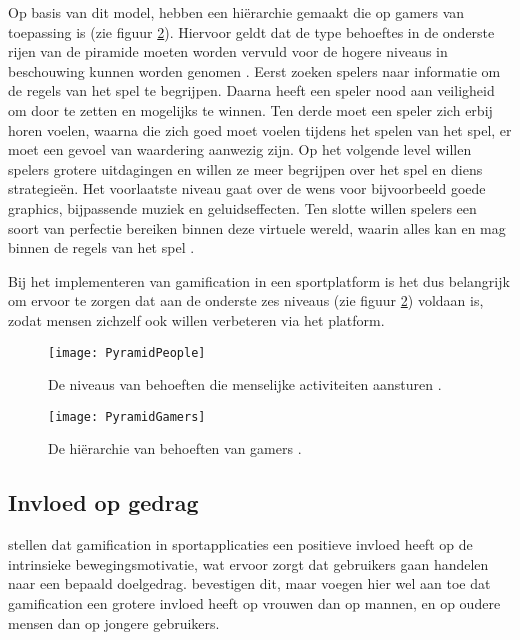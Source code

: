 Op basis van dit model, hebben \textcite{Siang2003} een hiërarchie gemaakt die op gamers van toepassing is (zie figuur \ref{fig:gamers-hierarchy}).
Hiervoor geldt dat de type behoeftes in de onderste rijen van de piramide moeten worden vervuld voor de hogere niveaus in beschouwing kunnen worden genomen \autocite{Richter2014}.
Eerst zoeken spelers naar informatie om de regels van het spel te begrijpen. Daarna heeft een speler nood aan veiligheid om door te zetten en mogelijks te winnen. Ten derde moet een speler zich erbij horen voelen, waarna die zich goed moet voelen tijdens het spelen van het spel, er moet een gevoel van waardering aanwezig zijn. Op het volgende level willen spelers grotere uitdagingen en willen ze meer begrijpen over het spel en diens strategieën. Het voorlaatste niveau gaat over de wens voor bijvoorbeeld goede graphics, bijpassende muziek en geluidseffecten. Ten slotte willen spelers een soort van perfectie bereiken binnen deze virtuele wereld, waarin alles kan en mag binnen de regels van het spel \autocite{Greitzer2007, Siang2003}.

Bij het implementeren van gamification in een sportplatform is het dus belangrijk om ervoor te zorgen dat aan de onderste zes niveaus (zie figuur \ref{fig:gamers-hierarchy}) voldaan is, zodat mensen zichzelf ook willen verbeteren via het platform.

\begin{figure}[h]
    \caption[Behoeften-hiërarchie algemeen]{De  niveaus van behoeften die menselijke activiteiten aansturen \autocite{Lilienfeld2014}.}
    \texttt{[image: PyramidPeople]}
    \label{fig:people-hierarchy}
\end{figure}


\begin{figure}[h]
    \caption[Behoeften-hiërarchie gamers]{De hiërarchie van behoeften van gamers \autocite{Richter2014}.}
    \texttt{[image: PyramidGamers]}
    \label{fig:gamers-hierarchy}
\end{figure}

\subsection{Invloed op gedrag}
\textcite{Kari2016} stellen dat gamification in sportapplicaties een positieve invloed heeft op de intrinsieke bewegingsmotivatie, wat ervoor zorgt dat gebruikers gaan handelen naar een bepaald doelgedrag. \textcite{PoloPena2020} bevestigen dit, maar voegen hier wel aan toe dat gamification een grotere invloed heeft op vrouwen dan op mannen, en op oudere mensen dan op jongere gebruikers.

